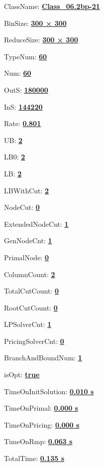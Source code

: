 \documentclass[11pt]{article}
\begin{document}
\pagestyle{empty}


ClassName: \underline{\textbf{Class_06.2bp-21}}
\par
BinSize: \underline{\textbf{300 × 300}}
\par
ReduceSize: \underline{\textbf{300 × 300}}
\par
TypeNum: \underline{\textbf{60}}
\par
Num: \underline{\textbf{60}}
\par
OutS: \underline{\textbf{180000}}
\par
InS: \underline{\textbf{144220}}
\par
Rate: \underline{\textbf{0.801}}
\par
UB: \underline{\textbf{2}}
\par
LB0: \underline{\textbf{2}}
\par
LB: \underline{\textbf{2}}
\par
LBWithCut: \underline{\textbf{2}}
\par
NodeCut: \underline{\textbf{0}}
\par
ExtendedNodeCnt: \underline{\textbf{1}}
\par
GenNodeCnt: \underline{\textbf{1}}
\par
PrimalNode: \underline{\textbf{0}}
\par
ColumnCount: \underline{\textbf{2}}
\par
TotalCutCount: \underline{\textbf{0}}
\par
RootCutCount: \underline{\textbf{0}}
\par
LPSolverCnt: \underline{\textbf{1}}
\par
PricingSolverCnt: \underline{\textbf{0}}
\par
BranchAndBoundNum: \underline{\textbf{1}}
\par
isOpt: \underline{\textbf{true}}
\par
TimeOnInitSolution: \underline{\textbf{0.010 s}}
\par
TimeOnPrimal: \underline{\textbf{0.000 s}}
\par
TimeOnPricing: \underline{\textbf{0.000 s}}
\par
TimeOnRmp: \underline{\textbf{0.063 s}}
\par
TotalTime: \underline{\textbf{0.135 s}}
\par
\newpage
\end{document}
